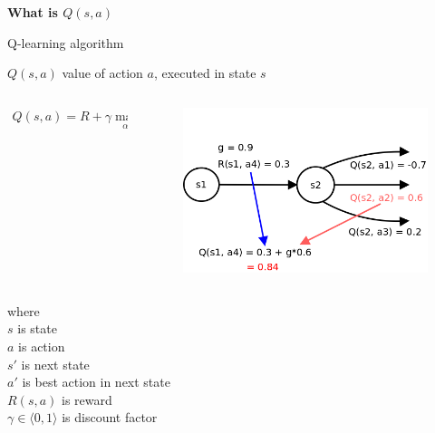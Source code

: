 \documentclass[xcolor=dvipsnames]{beamer}
\begin{document}
\begin{frame}{\bf What is $Q(s, a)$}

Q-learning algorithm

$Q(s, a)$ value of action $a$, executed in state $s$

\begin{columns}
\begin{column}{0.5\textwidth}

  \begin{align*}
  Q(s, a) = R + \gamma \max \limits_{\alpha'} Q(s', \alpha')
  \end{align*}

\end{column}
\begin{column}{0.5\textwidth}  %


  \begin{figure}[!htb]
    \centering
    \includegraphics[scale=0.2]{./diagrams/q_learning_detail.png}
  \end{figure}

\end{column}
\end{columns}



where \\
$s$ is state \\
$a$ is action \\
$s'$ is next state \\
$a'$ is best action in next state \\
$R(s, a)$ is reward \\
$\gamma \in \langle 0, 1 \rangle$ is discount factor \\


\end{frame}
\end{document}

